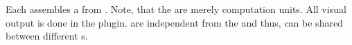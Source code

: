 \documentclass[../ClassicThesis.tex]{subfiles}
\begin{document}
Each {\fabmethod} assembles a  from
. Note, that the 
are merely computation units. All visual output is done in
the  plugin.  are
independent from the {\fabmethod} and thus, can be shared
between different {\fabmethod}s.








\end{document}
